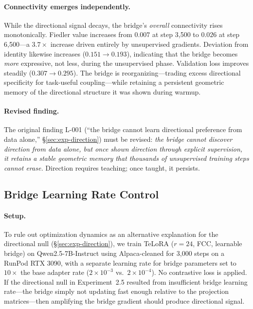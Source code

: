 \paragraph{Connectivity emerges independently.}
While the directional signal decays, the bridge's \emph{overall}
connectivity rises monotonically. Fiedler value increases from $0.007$ at
step 3{,}500 to $0.026$ at step 6{,}500---a $3.7\times$ increase driven
entirely by unsupervised gradients. Deviation from identity likewise
increases ($0.151 \to 0.193$), indicating that the bridge becomes
\emph{more} expressive, not less, during the unsupervised phase. Validation
loss improves steadily ($0.307 \to 0.295$). The bridge is
reorganizing---trading excess directional specificity for task-useful
coupling---while retaining a persistent geometric memory of the directional
structure it was shown during warmup.

\paragraph{Revised finding.}
The original finding L-001 (``the bridge cannot learn directional preference
from data alone,'' \S\ref{sec:exp-direction}) must be revised: \emph{the
bridge cannot discover direction from data alone, but once shown direction
through explicit supervision, it retains a stable geometric memory that
thousands of unsupervised training steps cannot erase.} Direction requires
teaching; once taught, it persists.

\subsection{Bridge Learning Rate Control}
\label{sec:exp-bridge-lr}

\paragraph{Setup.}
To rule out optimization dynamics as an alternative explanation for the
directional null (\S\ref{sec:exp-direction}), we train TeLoRA
($r\!=\!24$, FCC, learnable bridge) on Qwen2.5-7B-Instruct using
Alpaca-cleaned for 3{,}000 steps on a RunPod RTX 3090, with a separate
learning rate for bridge parameters set to $10\times$ the base adapter
rate ($2 \times 10^{-3}$ vs.\ $2 \times 10^{-4}$). No contrastive loss
is applied. If the directional null in Experiment~2.5 resulted from
insufficient bridge learning rate---the bridge simply not updating fast
enough relative to the projection matrices---then amplifying the bridge
gradient should produce directional signal.

